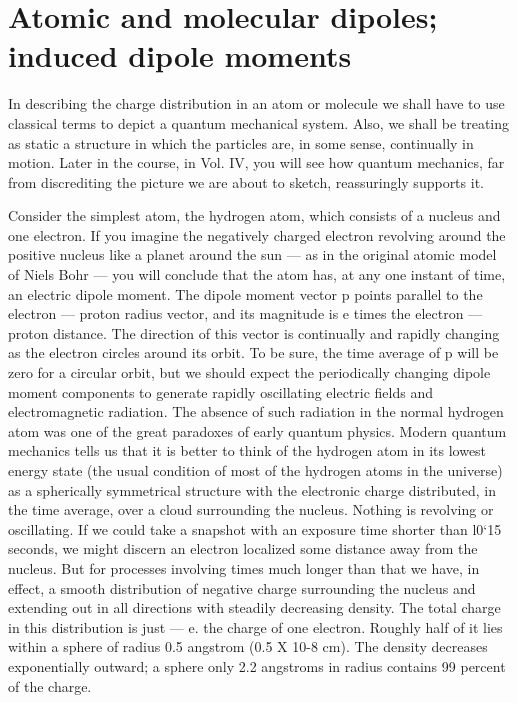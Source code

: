 
\iffalse

\section{Atomic and molecular dipoles; induced dipole moments}

In describing the charge distribution in an atom or molecule we
shall have to use classical terms to depict a quantum mechanical
system. Also, we shall be treating as static a structure in which the
particles are, in some sense, continually in motion. Later in the
course, in Vol. IV, you will see how quantum mechanics, far from discrediting
the picture we are about to sketch, reassuringly supports it.

Consider the simplest atom, the hydrogen atom, which consists of
a nucleus and one electron. If you imagine the negatively charged
electron revolving around the positive nucleus like a planet around
the sun --- as in the original atomic model of Niels Bohr --- you will
conclude that the atom has, at any one instant of time, an electric
dipole moment. The dipole moment vector p points parallel to the
electron --- proton radius vector, and its magnitude is e times the
electron --- proton distance. The direction of this vector is continually
and rapidly changing as the electron circles around its orbit. To be
sure, the time average of p will be zero for a circular orbit, but we
should expect the periodically changing dipole moment components
to generate rapidly oscillating electric fields and electromagnetic
radiation. The absence of such radiation in the normal hydrogen
atom was one of the great paradoxes of early quantum physics.
Modern quantum mechanics tells us that it is better to think of the
hydrogen atom in its lowest energy state (the usual condition of most
of the hydrogen atoms in the universe) as a spherically symmetrical
structure with the electronic charge distributed, in the time average,
over a cloud surrounding the nucleus. Nothing is revolving or
oscillating. If we could take a snapshot with an exposure time
shorter than l0‘15 seconds, we might discern an electron localized
some distance away from the nucleus. But for processes involving
times much longer than that we have, in effect, a smooth distribution
of negative charge surrounding the nucleus and extending out in all
directions with steadily decreasing density. The total charge in this
distribution is just  --- e. the charge of one electron. Roughly half of
it lies within a sphere of radius 0.5 angstrom (0.5 X 10-8 cm). The
density decreases exponentially outward; a sphere only 2.2 angstroms
in radius contains 99 percent of the charge.

